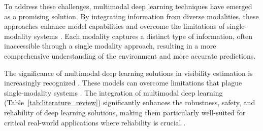 
To address these challenges, multimodal deep learning techniques have emerged as a promising solution. By integrating information from diverse modalities, these approaches enhance model capabilities and overcome the limitations of single-modality systems \cite{liu2018learn, castanedo2013review, molino2021improved, blasch2021machine}. Each modality captures a distinct type of information, often inaccessible through a single modality approach, resulting in a more comprehensive understanding of the environment and more accurate predictions.

The significance of multimodal deep learning solutions in visibility estimation is increasingly recognized \cite{palvanov_visnet_2019, department_of_computer_science_chu_hai_college_of_higher_education_80_castle_peak_road_castle_peak_bay_tuen_mun_nt_hong_kong_meteorology_2020, AitOuadil2023, app11030997, Zhang2023, You2022, Chen2022, Wauben2016, Cheng2018, Zhou2021}. These models can overcome limitations that plague single-modality systems \cite{huang2021makesmultimodallearningbetter}. The integration of multimodal deep learning (Table~\ref{tab:literature_review}) significantly enhances the robustness, safety, and reliability of deep learning solutions, making them particularly well-suited for critical real-world applications where reliability is crucial \cite{6817512, liang2024foundationsmultisensoryartificialintelligence}.



